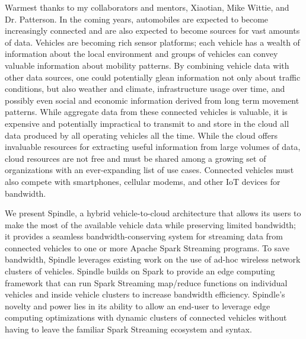 \documentclass{thesis}
\author{William Rory Kronmiller}
\begin{document}
 
\titlepage             %
\tableofcontents       %
\listoftables          %
\listoffigures         %


    Warmest thanks to my collaborators and mentors, Xiaotian, Mike Wittie, and Dr. Patterson.
    In the coming years, automobiles are expected to become increasingly connected and are
    also expected to become sources for vast amounts of data. Vehicles are  
    becoming rich sensor platforms; each vehicle has a wealth of information about the local
    environment and groups of vehicles can convey valuable information about mobility patterns.
    By combining vehicle data with other data sources, one could potentially glean information
    not only about traffic conditions, but also weather and climate, infrastructure usage over
    time, and possibly even social and economic information derived from long term movement
    patterns. While aggregate data from these connected vehicles is valuable, it is expensive
    and potentially impractical to transmit to and store in the cloud all data produced by 
    all operating vehicles all the time. While the cloud offers invaluable resources for
    extracting useful information from large volumes of data, cloud resources are not 
    free and must be shared among a growing set of organizations with an ever-expanding
    list of use cases. Connected vehicles must also compete with smartphones, cellular
    modems, and other IoT devices for bandwidth.
    
    We present Spindle, a hybrid vehicle-to-cloud architecture that allows its users to make
    the most of the available vehicle data while preserving limited bandwidth; it provides a 
    seamless bandwidth-conserving system for streaming data from connected vehicles to one 
    or more Apache Spark Streaming programs. To save bandwidth, Spindle leverages existing 
    work on the use of ad-hoc wireless network clusters of vehicles. Spindle builds on Spark
    to provide an edge computing framework that can run Spark Streaming  map/reduce functions on
    individual vehicles and inside vehicle clusters to increase bandwidth efficiency.
    Spindle's novelty and power lies in its ability to allow an end-user to leverage edge
    computing optimizations with dynamic clusters of connected vehicles without having to
    leave the familiar Spark Streaming ecosystem and syntax.
\end{document}
